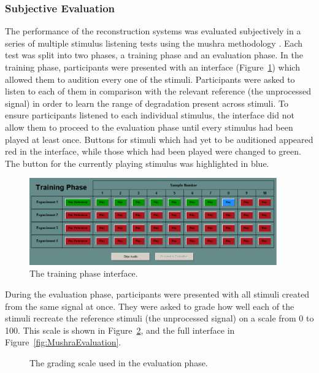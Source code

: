 		\subsubsection*{Subjective Evaluation}
			The performance of the reconstruction systems was evaluated subjectively in a series of multiple
			stimulus listening tests using the \acrshort{mushra} methodology \citep{mushra2014}. Each test was
			split into two phases, a training phase and an evaluation phase. In the training phase,
			participants were presented with an interface (Figure~\ref{fig:MushraTraining}) which allowed them
			to audition every one of the stimuli. Participants were asked to listen to each of them in
			comparison with the relevant reference (the unprocessed signal) in order to learn the range of
			degradation present across stimuli. To ensure participants listened to each individual stimulus,
			the interface did not allow them to proceed to the evaluation phase until every stimulus had been
			played at least once.  Buttons for stimuli which had yet to be auditioned appeared red in the
			interface, while those which had been played were changed to green. The button for the currently
			playing stimulus was highlighted in blue.

			\begin{figure}[h!]
				\centering
				\includegraphics[width=0.95\textwidth]{chapter7/Images/MushraTraining.png}
				\caption{The training phase interface.}
				\label{fig:MushraTraining}
			\end{figure}

			During the evaluation phase, participants were presented with all stimuli created from the same
			signal at once. They were asked to grade how well each of the stimuli recreate the reference
			stimuli (the unprocessed signal) on a scale from 0 to 100. This scale is shown in
			Figure~\ref{fig:MushraScale}, and the full interface in Figure~\ref{fig:MushraEvaluation}.

			\begin{figure}[h!]
				\centering
				\caption{The grading scale used in the evaluation phase.}
				\label{fig:MushraScale}
			\end{figure}

